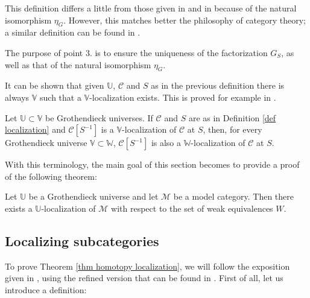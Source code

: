 \begin{refsection}
\begin{rmk}
This definition differs a little from those given in \cite{gz} and in \cite{weibel} because of the natural isomorphism $\eta_G$. However, this matches better the philosophy of category theory; a similar definition can be found in \cite[Ch. 7.1]{kashiwara}.
\end{rmk}

\begin{rmk}
The purpose of point 3. is to ensure the uniqueness of the factorization $G_S$, as well as that of the natural isomorphism $\eta_G$.
\end{rmk}

\begin{rmk}
It can be shown that given $\mathbb U$, $\mathcal C$ and $S$ as in the previous definition there is always $\mathbb V$ such that a $\mathbb V$-localization exists. This is proved for example in \cite[I.1]{gz}.
\end{rmk}

\begin{rmk} \label{remark enlarging universe}
Let $\mathbb U \subset \mathbb V$ be Grothendieck universes. If $\mathcal C$ and $S$ are as in Definition \ref{def localization} and $\mathcal C[S^{-1}]$ is a $\mathbb V$-localization of $\mathcal C$ at $S$, then, for every Grothendieck universe $\mathbb V \subset \mathbb W$, $\mathcal C[S^{-1}]$ is also a $\mathbb W$-localization of $\mathcal C$ at $S$.
\end{rmk}

With this terminology, the main goal of this section becomes to provide a proof of the following theorem:

\begin{thm} \label{thm homotopy localization}
Let $\mathbb U$ be a Grothendieck universe and let $\mathcal M$ be a model category. Then there exists a $\mathbb U$-localization of $\mathcal M$ with respect to the set of weak equivalences $W$.
\end{thm}

\subsection{Localizing subcategories}

To prove Theorem \ref{thm homotopy localization}, we will follow the exposition given in \cite{dhk}, using the refined version that can be found in \cite{riehl}.  First of all, let us introduce a definition:


\end{refsection}
